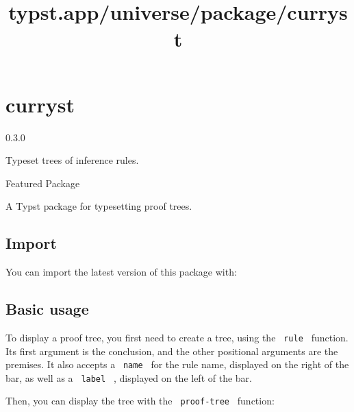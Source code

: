 \title{typst.app/universe/package/curryst}

\label{banner}
\section{curryst}\label{curryst}

{ 0.3.0 }

Typeset trees of inference rules.

{ } Featured Package

\label{readme}
A Typst package for typesetting proof trees.

\subsection{Import}\label{import}

You can import the latest version of this package with:

\begin{Shaded}
\begin{Highlighting}[]
\end{Highlighting}
\end{Shaded}

\subsection{Basic usage}\label{basic-usage}

To display a proof tree, you first need to create a tree, using the
\texttt{\ rule\ } function. Its first argument is the conclusion, and
the other positional arguments are the premises. It also accepts a
\texttt{\ name\ } for the rule name, displayed on the right of the bar,
as well as a \texttt{\ label\ } , displayed on the left of the bar.

\begin{Shaded}
\begin{Highlighting}[]
\NormalTok{  [Conclusion],}
\NormalTok{  [Premise 1],}
\NormalTok{  [Premise 2],}
\NormalTok{  [Premise 3]}
\NormalTok{)}
\end{Highlighting}
\end{Shaded}

Then, you can display the tree with the \texttt{\ proof-tree\ }
function:

\begin{Shaded}
\begin{Highlighting}[]
\end{Highlighting}
\end{Shaded}

